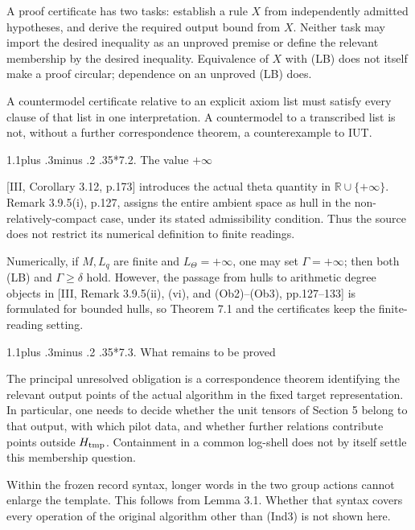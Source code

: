 \documentclass[11pt,a4paper]{amsart}
\makeatletter
\renewcommand\subsection{\@startsection{subsection}{2}{\z@}
{1.1\baselineskip plus .3\baselineskip minus .2\baselineskip}
{.35\baselineskip}{\normalfont\bfseries}}
\makeatother
\begin{document}
A proof certificate has two tasks: establish a rule $X$ from independently admitted hypotheses, and derive the required output bound from $X$. Neither task may import the desired inequality as an unproved premise or define the relevant membership by the desired inequality. Equivalence of $X$ with (LB) does not itself make a proof circular; dependence on an unproved (LB) does.


A countermodel certificate relative to an explicit axiom list must satisfy every clause of that list in one interpretation. A countermodel to a transcribed list is not, without a further correspondence theorem, a counterexample to IUT.


\subsection*{7.2. The value $+\infty$}

[III, Corollary 3.12, p.173] introduces the actual theta quantity in $\mathbb R\cup\{+\infty\}$. Remark 3.9.5(i), p.127, assigns the entire ambient space as hull in the non-relatively-compact case, under its stated admissibility condition. Thus the source does not restrict its numerical definition to finite readings.


Numerically, if $M,L_q$ are finite and $L_\Theta=+\infty$, one may set $\Gamma=+\infty$; then both (LB) and $\Gamma\ge\delta$ hold. However, the passage from hulls to arithmetic degree objects in [III, Remark 3.9.5(ii), (vi), and (Ob2)--(Ob3), pp.127--133] is formulated for bounded hulls, so Theorem 7.1 and the certificates keep the finite-reading setting.


\subsection*{7.3. What remains to be proved}

The principal unresolved obligation is a correspondence theorem identifying the relevant output points of the actual algorithm in the fixed target representation. In particular, one needs to decide whether the unit tensors of Section 5 belong to that output, with which pilot data, and whether further relations contribute points outside $H_{\rm tmp}$. Containment in a common log-shell does not by itself settle this membership question.


Within the frozen record syntax, longer words in the two group actions cannot enlarge the template. This follows from Lemma 3.1. Whether that syntax covers every operation of the original algorithm other than (Ind3) is not shown here.
\end{document}
